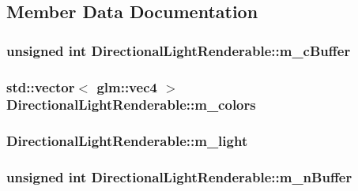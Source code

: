 \subsection{Member Data Documentation}
\hypertarget{classDirectionalLightRenderable_a0127ba14dca5423b39dd3fc48f9f320b}{
\subsubsection[{m\+\_\+c\+Buffer}]{\setlength{\rightskip}{0pt plus 5cm}unsigned int Directional\+Light\+Renderable\+::m\+\_\+c\+Buffer\hspace{0.3cm}{\ttfamily [private]}}}\label{classDirectionalLightRenderable_a0127ba14dca5423b39dd3fc48f9f320b}
\hypertarget{classDirectionalLightRenderable_a74752273696bdaf32922d0588eb5ffbe}{
\subsubsection[{m\+\_\+colors}]{\setlength{\rightskip}{0pt plus 5cm}std\+::vector$<$ glm\+::vec4 $>$ Directional\+Light\+Renderable\+::m\+\_\+colors\hspace{0.3cm}{\ttfamily [private]}}}\label{classDirectionalLightRenderable_a74752273696bdaf32922d0588eb5ffbe}
\hypertarget{classDirectionalLightRenderable_a9486047a7b997642ce897b0d4e241d19}{
\subsubsection[{m\+\_\+light}]{ Directional\+Light\+Renderable\+::m\+\_\+light\hspace{0.3cm}{\ttfamily [private]}}}\label{classDirectionalLightRenderable_a9486047a7b997642ce897b0d4e241d19}
\hypertarget{classDirectionalLightRenderable_afb94e4253a5c4af4a6cd25b443b71ba4}{
\subsubsection[{m\+\_\+n\+Buffer}]{\setlength{\rightskip}{0pt plus 5cm}unsigned int Directional\+Light\+Renderable\+::m\+\_\+n\+Buffer\hspace{0.3cm}{\ttfamily [private]}}}\label{classDirectionalLightRenderable_afb94e4253a5c4af4a6cd25b443b71ba4}
